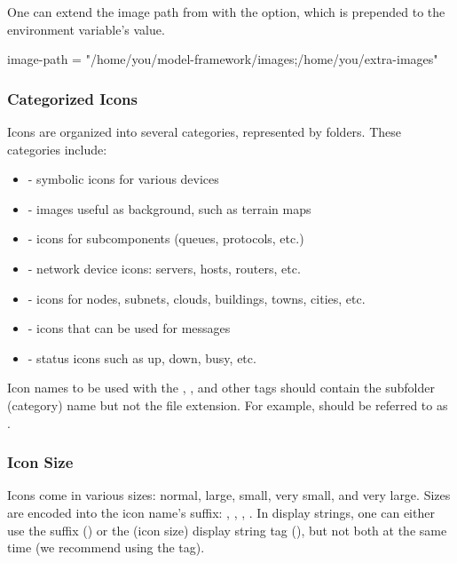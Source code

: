 One can extend the image path from  with the
 option, which is prepended to the environment
variable's value.

\begin{inifile}
[General]
image-path = "/home/you/model-framework/images;/home/you/extra-images"
\end{inifile}


\subsubsection{Categorized Icons}
\label{sec:graphics:categorized-icons}

Icons are organized into several categories, represented by folders.
These categories include:

\begin{itemize}
  \item {} - symbolic icons for various devices
  \item {} - images useful as background, such as terrain maps
  \item {} - icons for subcomponents (queues, protocols, etc.)
  \item {} - network device icons: servers, hosts, routers, etc.
  \item {} - icons for nodes, subnets, clouds, buildings, towns, cities, etc.
  \item {} - icons that can be used for messages
  \item {} - status icons such as up, down, busy, etc.
\end{itemize}

Icon names to be used with the , , and other tags should contain
the subfolder (category) name but not the file extension. For example,
 should be referred to as
.


\subsubsection{Icon Size}
\label{sec:graphics:icon-size}

Icons come in various sizes: normal, large, small, very small, and very large.
Sizes are encoded into the icon name's suffix: , , ,
. In display strings, one can either use the suffix
() or the  (icon size) display string tag
(), but not both at the same time (we recommend
using the  tag).

